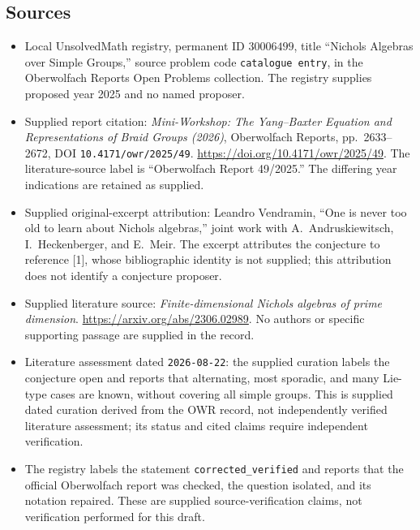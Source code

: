 \documentclass[11pt]{article}
\begin{document}
\subsection{Sources}
\begin{itemize}
\item Local UnsolvedMath registry, permanent ID \(30006499\), title ``Nichols Algebras over Simple Groups,'' source problem code \texttt{catalogue entry}, in the Oberwolfach Reports Open Problems collection. The registry supplies proposed year 2025 and no named proposer.
\item Supplied report citation: \emph{Mini-Workshop: The Yang--Baxter Equation and Representations of Braid Groups (2026)}, Oberwolfach Reports, pp.\ 2633--2672, DOI \texttt{10.4171/owr/2025/49}. \url{https://doi.org/10.4171/owr/2025/49}. The literature-source label is ``Oberwolfach Report 49/2025.'' The differing year indications are retained as supplied.
\item Supplied original-excerpt attribution: Leandro Vendramin, ``One is never too old to learn about Nichols algebras,'' joint work with A.\ Andruskiewitsch, I.\ Heckenberger, and E.\ Meir. The excerpt attributes the conjecture to reference [1], whose bibliographic identity is not supplied; this attribution does not identify a conjecture proposer.
\item Supplied literature source: \emph{Finite-dimensional Nichols algebras of prime dimension}. \url{https://arxiv.org/abs/2306.02989}. No authors or specific supporting passage are supplied in the record.
\item Literature assessment dated \texttt{2026-08-22}: the supplied curation labels the conjecture open and reports that alternating, most sporadic, and many Lie-type cases are known, without covering all simple groups. This is supplied dated curation derived from the OWR record, not independently verified literature assessment; its status and cited claims require independent verification.
\item The registry labels the statement \texttt{corrected\_verified} and reports that the official Oberwolfach report was checked, the question isolated, and its notation repaired. These are supplied source-verification claims, not verification performed for this draft.
\end{itemize}
\end{document}
